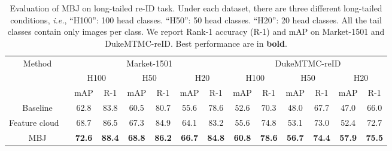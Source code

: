 \documentclass[final]{cvpr}
\begin{document}
\begin{table*}[th]
\small 
\centering
\setlength{\tabcolsep}{7.5pt}
\begin{tabular}{c|cccccc|cccccc}
\hline
\multirow{3}{*}{Method}                            & \multicolumn{6}{c|}{Market-1501}                                                                                                                                                                    & \multicolumn{6}{c}{DukeMTMC-reID}                                                                                                                                                                  \\ \cline{2-13} 
                                                   & \multicolumn{2}{c|}{H100}           & \multicolumn{2}{c|}{H50}             & \multicolumn{2}{c|}{H20}            & \multicolumn{2}{c|}{H100}           & \multicolumn{2}{c|}{H50}             & \multicolumn{2}{c}{H20}             \\ \cline{2-13} 
                                                   & mAP                            & R-1                            & mAP                            & R-1                            & mAP                            & R-1                            & mAP                            & R-1                            & mAP                            & R-1                            & mAP                            & R-1                            \\ \hline
Baseline                                           & 62.8                           & 83.8                           & 60.5                           & 80.7                           & 55.6                           & 78.6                           & 52.6                           & 70.3                           & 48.0                           & 67.7                           & 47.0                           & 66.0                           \\
Feature cloud ~\cite{featurecloud} & 68.7                           & 86.5                           & 67.3                           & 84.9                           & 64.1                           & 83.2                           & 55.6                           & 74.8                           & 53.1                           & 73.0                           & 52.4                           & 72.7                           \\ \hline
MBJ                                                & \textbf{72.6} & \textbf{88.4} & \textbf{68.8} & \textbf{86.2} & \textbf{66.7} & \textbf{84.8} & \textbf{60.8} & \textbf{78.6} & \textbf{56.7} & \textbf{74.4} & \textbf{57.9} & \textbf{75.5} \\ \hline
\end{tabular}
\caption{Evaluation of MBJ on long-tailed re-ID task. Under each dataset, there are three different long-tailed conditions, \emph{i.e.}, ``H100'': 100 head classes. ``H50'': 50 head classes. ``H20'': 20 head classes. All the tail classes contain only  images per class. We report Rank-1 accuracy (R-1) and mAP on Market-1501 and DukeMTMC-reID. Best performance are in \textbf{bold}.}
\label{tab:reid}
\vspace{-0.5cm}
\end{table*}
\end{document}
